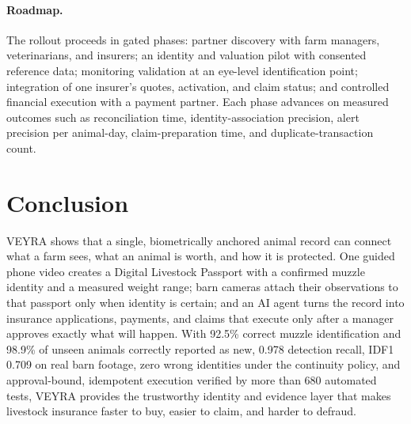 \documentclass[11pt,letterpaper]{article}
\begin{document}
\paragraph{Roadmap.} The rollout proceeds in gated phases: partner discovery with farm managers, veterinarians, and insurers; an identity and valuation pilot with consented reference data; monitoring validation at an eye-level identification point; integration of one insurer's quotes, activation, and claim status; and controlled financial execution with a payment partner. Each phase advances on measured outcomes such as reconciliation time, identity-association precision, alert precision per animal-day, claim-preparation time, and duplicate-transaction count.

\section{Conclusion}

VEYRA shows that a single, biometrically anchored animal record can connect what a farm sees, what an animal is worth, and how it is protected. One guided phone video creates a Digital Livestock Passport with a confirmed muzzle identity and a measured weight range; barn cameras attach their observations to that passport only when identity is certain; and an AI agent turns the record into insurance applications, payments, and claims that execute only after a manager approves exactly what will happen. With 92.5\% correct muzzle identification and 98.9\% of unseen animals correctly reported as new, 0.978 detection recall, IDF1 0.709 on real barn footage, zero wrong identities under the continuity policy, and approval-bound, idempotent execution verified by more than 680 automated tests, VEYRA provides the trustworthy identity and evidence layer that makes livestock insurance faster to buy, easier to claim, and harder to defraud.
\end{document}
